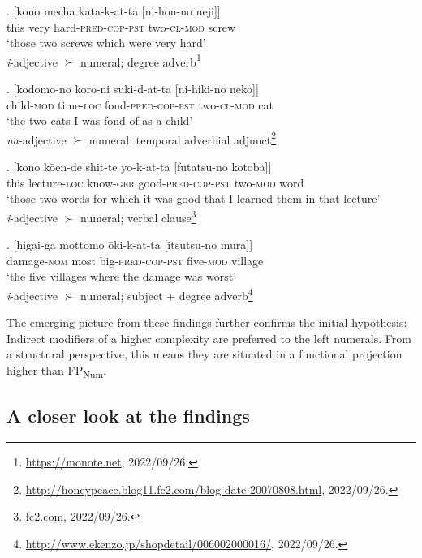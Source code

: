 \documentclass [output=book,colorlinks,citecolor=brown]{langscibook}
\begin{document}
\newpage

\exg. [kono mecha kata-k-at-ta [ni-hon-no neji]]\\
this very hard-\textsc{pred-cop-pst} two-\textsc{cl-mod} screw\\
`those two screws which were very hard'\\ \null \hfill \textit{i}-adjective $\succ$ numeral; degree adverb\footnote{\url{https://monote.net}, 2022/09/26.}

\exg. [kodomo-no koro-ni suki-d-at-ta [ni-hiki-no neko]]\\ %
child-\textsc{mod} time-\textsc{loc} fond-\textsc{pred-cop-pst} two-\textsc{cl-mod} cat\\
`the two cats I was fond of as a child' \\ \null \hfill \textit{na}-adjective $\succ$ numeral; temporal adverbial adjunct\footnote{\url{http://honeypeace.blog11.fc2.com/blog-date-20070808.html}, 2022/09/26.}

\exg. [kono kōen-de shit-te yo-k-at-ta [futatsu-no kotoba]] \\
this lecture-\textsc{loc} know-\textsc{ger} good-\textsc{pred-cop-pst} two-\textsc{mod} word\\
`those two words for which it was good that I learned them in that lecture' \\ \null \hfill \textit{i}-adjective $\succ$ numeral; verbal clause\footnote{\url{fc2.com}, 2022/09/26.}

\exg. [higai-ga mottomo ōki-k-at-ta [itsutsu-no mura]] \\ %
damage-\textsc{nom} most big-\textsc{pred-cop-pst} five-\textsc{mod} village\\
`the five villages where the damage was worst' \\ \null \hfill \textit{i}-adjective $\succ$ numeral; subject + degree adverb\footnote{\url{http://www.ekenzo.jp/shopdetail/006002000016/}, 2022/09/26.}

The emerging picture from these findings further confirms the initial hypothesis: Indirect modifiers of a higher complexity are preferred to the left numerals. From a structural perspective, this means they are situated in a functional projection higher than FP\textsubscript{Num}.

\subsection{A closer look at the findings}
\end{document}

